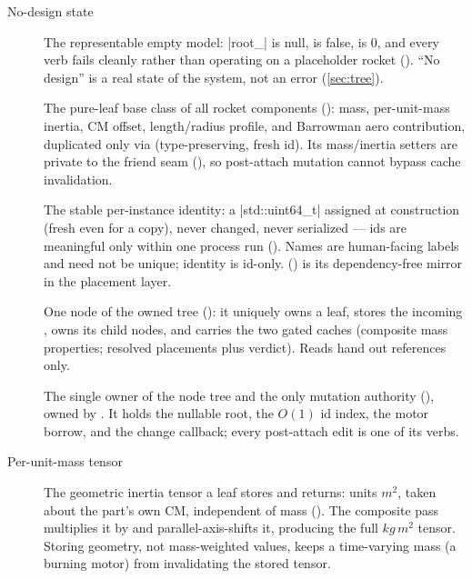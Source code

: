 \begin{description}
\item[No-design state] The representable empty model: \cppinline|root_| is null,
   is false,  is 0, and every verb fails cleanly rather
  than operating on a placeholder rocket (). ``No
  design'' is a real state of the system, not an error (\cref{sec:tree}).

\item[] The pure-leaf base class of all rocket components
  (): mass, per-unit-mass inertia, CM offset,
  length/radius profile, and Barrowman aero contribution, duplicated only via
   (type-preserving, fresh id). Its mass/inertia setters are private to
  the  friend seam (), so
  post-attach mutation cannot bypass cache invalidation.

\item[] The stable per-instance identity: a \cppinline|std::uint64_t|
  assigned at construction (fresh even for a copy), never changed, never serialized ---
  ids are meaningful only within one process run
  (). Names are human-facing labels and need not be
  unique; identity is id-only.  ()
  is its dependency-free mirror in the placement layer.

\item[] One node of the owned tree ():
  it uniquely owns a  leaf, stores the incoming , owns its
  child nodes, and carries the two gated caches (composite mass properties; resolved
  placements plus verdict). Reads hand out  references only.

\item[] The single owner of the node tree and the only mutation
  authority (), owned by . It holds
  the nullable root, the $O(1)$ id index, the motor borrow, and the change callback;
  every post-attach edit is one of its verbs.

\item[Per-unit-mass tensor] The geometric inertia tensor a leaf stores and
   returns: units $\unit{m^2}$, taken about the part's own CM, independent
  of mass (). The composite pass multiplies it by
   and parallel-axis-shifts it, producing the full
  $\unit{kg\,m^2}$ tensor. Storing geometry, not mass-weighted values, keeps a
  time-varying mass (a burning motor) from invalidating the stored tensor.


\end{description}
